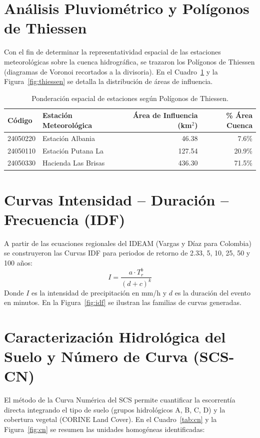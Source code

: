 \documentclass[11pt,a4paper]{article}
\begin{document}
\section{Análisis Pluviométrico y Polígonos de Thiessen}
Con el fin de determinar la representatividad espacial de las estaciones meteorológicas sobre la cuenca hidrográfica, se trazaron los Polígonos de Thiessen (diagramas de Voronoi recortados a la divisoria). En el Cuadro~\ref{tab:thiessen} y la Figura~\ref{fig:thiessen} se detalla la distribución de áreas de influencia.

\begin{table}[H]
\centering
\caption{Ponderación espacial de estaciones según Polígonos de Thiessen.}
\label{tab:thiessen}
\begin{tabular}{llrr}\toprule
\textbf{Código} & \textbf{Estación Meteorológica} & \textbf{Área de Influencia (km$^2$)} & \textbf{\% Área Cuenca} \\\midrule
24050220 & Estación Albania & 46.38 & 7.6\% \\
24050110 & Estación Putana La & 127.54 & 20.9\% \\
24050330 & Hacienda Las Brisas & 436.30 & 71.5\% \\
\bottomrule
\end{tabular}
\end{table}



\section{Curvas Intensidad -- Duración -- Frecuencia (IDF)}
A partir de las ecuaciones regionales del IDEAM (Vargas y Díaz para Colombia) se construyeron las Curvas IDF para periodos de retorno de 2.33, 5, 10, 25, 50 y 100 años:
\begin{equation}
I = \frac{a \cdot T_r^b}{(d + c)^k}
\end{equation}
Donde $I$ es la intensidad de precipitación en mm/h y $d$ es la duración del evento en minutos. En la Figura~\ref{fig:idf} se ilustran las familias de curvas generadas.



\section{Caracterización Hidrológica del Suelo y Número de Curva (SCS-CN)}
El método de la Curva Numérica del SCS permite cuantificar la escorrentía directa integrando el tipo de suelo (grupos hidrológicos A, B, C, D) y la cobertura vegetal (CORINE Land Cover). En el Cuadro~\ref{tab:cn} y la Figura~\ref{fig:cn} se resumen las unidades homogéneas identificadas:
\end{document}
